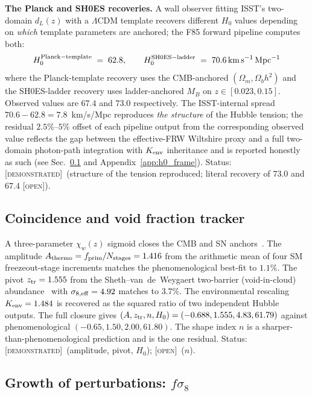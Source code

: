 \documentclass[aps,prd,twocolumn,nofootinbib,floatfix,superscriptaddress]{revtex4-2}
\newcommand{\DEMO}{{\color{black!70!blue}\textsc{[demonstrated]}}}
\newcommand{\OPEN}{{\color{black!60!red}\textsc{[open]}}}
\newcommand{\fprim}{f_{\rm prim}}
\begin{document}
\textbf{The Planck and SH0ES recoveries.} A wall observer fitting
ISST's two-domain $d_L(z)$ with a $\Lambda$CDM template recovers
different $H_0$ values depending on \emph{which} template parameters
are anchored; the F85 forward pipeline computes both:
\begin{equation}
\label{eq:F85_pipeline}
H_0^{\rm Planck-template} \;=\; 62.8,
\qquad
H_0^{\rm SH0ES-ladder} \;=\; 70.6\,{\rm km\,s^{-1}\,Mpc^{-1}}
\end{equation}
where the Planck-template recovery uses the CMB-anchored
$(\Omega_m, \Omega_b h^2)$ and the SH0ES-ladder recovery uses
ladder-anchored $M_B$ on $z\in[0.023,0.15]$. Observed
values are $67.4$ and $73.0$ respectively. The
ISST-internal spread $70.6 - 62.8 = 7.8$~km/s/Mpc reproduces
\emph{the structure} of the Hubble tension; the residual
$2.5\%$--$5\%$ offset of each pipeline output from the corresponding
observed value reflects the gap between the effective-FRW Wiltshire
proxy and a full two-domain photon-path integration with $K_{\rm env}$
inheritance and is reported honestly as such (see
Sec.~\ref{sec:tracker} and Appendix~\ref{app:h0_frame}). Status:
\DEMO\ (structure of the tension reproduced; literal recovery of
$73.0$ and $67.4$ \OPEN).

\subsection{Coincidence and void fraction tracker}
\label{sec:tracker}

A three-parameter $\chi_w(z)$ sigmoid closes the CMB and SN
anchors~\cite{Dam2017,NazerWiltshire2015}.
The amplitude $A_{\rm thermo}=\fprim/N_{\rm stages}=1.416$ from the
arithmetic mean of four SM freezeout-stage increments matches the
phenomenological best-fit to $1.1\%$. The pivot
$z_{\rm tr}=1.555$ from the Sheth--van~de~Weygaert two-barrier
(void-in-cloud) abundance~\cite{Sheth2004} with
$\sigma_{8,{\rm eff}}=4.92$ matches
to $3.7\%$. The environmental rescaling $K_{\rm env}=1.484$ is
recovered as the squared ratio of two independent Hubble outputs.
The full closure gives $(A,z_{\rm tr},n,H_0)=(-0.688,1.555,4.83,61.79)$
against phenomenological $(-0.65,1.50,2.00,61.80)$. The
shape index $n$ is a sharper-than-phenomenological prediction and
is the one residual. Status: \DEMO\ (amplitude, pivot, $H_0$);
\OPEN\ ($n$).

\subsection{Growth of perturbations: $f\sigma_8$}
\end{document}
